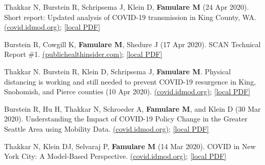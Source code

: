\documentclass{article}
\begin{document}
\begin{llist}
\begin{items}
	\item[{[9]}] Thakkar N, Burstein R, Schripsema J, Klein D, \textbf{Famulare M} (24 Apr 2020). Short report: Updated analysis of COVID-19 transmission in 
	King County, WA. \href{https://iazpvnewgrp01.blob.core.windows.net/source/2021-02/reports/pdf/Updated.analysis.of_.COVID-19.transmission.in_.King_.County.pdf}{(covid.idmod.org)}; \href{https://famulare.github.io/assets/publication-mirror/Updated.analysis.of_.COVID-19.transmission.in_.King_.County.pdf}{[local PDF]}
	
	\item[{[8]}] Burstein R, Cowgill K, \textbf{Famulare M}, Shedure J (17 Apr 2020). SCAN Technical Report \#1. \href{https://publichealthinsider.com/wp-content/uploads/2020/04/SCAN-Technical-Report-1-v2-23-APR-2020.pdf}{(publichealthinsider.com)}; \href{https://famulare.github.io/assets/publication-mirror/SCAN-Technical-Report-1-v2-23-APR-2020.pdf}{[local PDF]}
	
	\item[{[7]}] Thakkar N. Burstein R, Klein D, Schripsema J, \textbf{Famulare M}. Physical distancing is working and still needed to prevent COVID-19 resurgence in King, Snohomish, and Pierce counties (10 Apr 2020). \href{https://iazpvnewgrp01.blob.core.windows.net/source/2021-02/reports/pdf/Physical_distancing_working_and_still_needed_to_prevent_COVID-19_resurgence.pdf}{(covid.idmod.org)}; \href{https://famulare.github.io/assets/publication-mirror/Physical_distancing_working_and_still_needed_to_prevent_COVID-19_resurgence.pdf}{[local PDF]}
	
	\item[{[6]}]
	Burstein R, Hu H, Thakkar N, Schroeder A, \textbf{Famulare M}, and Klein D (30 Mar 2020).	Understanding the Impact of COVID-19 Policy Change in the Greater Seattle Area using Mobility Data. \href{https://iazpvnewgrp01.blob.core.windows.net/source/2021-02/reports/pdf/Understanding_impact_of_COVID_policy_change_Seattle_0.pdf}{(covid.idmod.org)}; \href{https://famulare.github.io/assets/publication-mirror/Understanding_impact_of_COVID_policy_change_Seattle_0.pdf}{[local PDF]}
	
	\item[{[5]}] Thakkar N, Klein DJ, Selvaraj P, \textbf{Famulare M} (14 Mar 2020). COVID in New York City: A Model-Based Perspective. \href{https://iazpvnewgrp01.blob.core.windows.net/source/2021-02/reports/pdf/COVID_Modeling_NYC.pdf}{(covid.idmod.org)}; \href{https://famulare.github.io/assets/publication-mirror/COVID_Modeling_NYC.pdf}{[local PDF]}
		

\end{items}
\end{llist}
\end{document}
